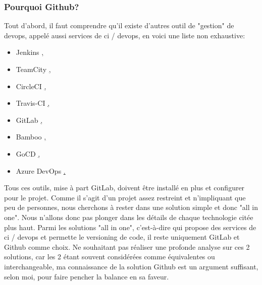 \documentclass[
    iai, %
    il, %
]{heig-tb}
\begin{document}
\subsubsection{Pourquoi Github?}
Tout d'abord, il faut comprendre qu'il existe d'autres outil de "gestion" de \Gls{devops}, appelé aussi services de \Gls{ci} / \Gls{devops}, en voici une liste non exhaustive:
\begin{itemize}
    \item Jenkins \href{https://www.jenkins.io/},
    \item TeamCity \href{https://www.jetbrains.com/teamcity/},
    \item CircleCI \href{https://www.guru99.com/top-20-continuous-integration-tools.html},
    \item Travis-CI \href{https://www.travis-ci.com/},
    \item GitLab \href{https://about.gitlab.com/},
    \item Bamboo \href{https://www.atlassian.com/software/bamboo},
    \item GoCD \href{https://www.gocd.org/},
    \item Azure DevOps \href{https://azure.microsoft.com/fr-fr/services/devops/}.
\end{itemize}

Tous ces outils, mise à part GitLab, doivent être installé en plus et configurer pour le projet.\newline
Comme il s'agit d'un projet assez restreint et n'impliquant que peu de personnes, nous cherchons à rester dans une solution simple et donc "all in one".\newline
Nous n'allons donc pas plonger dans les détails de chaque technologie citée plus haut.\newline
Parmi les solutions "all in one", c'est-à-dire qui propose des services de \Gls{ci} / \Gls{devops} et permette le versioning de code, il reste uniquement GitLab et Github comme choix.\newline
Ne souhaitant pas réaliser une profonde analyse sur ces 2 solutions, car les 2 étant souvent considérées comme équivalentes ou interchangeable, ma connaissance de la solution Github est un argument suffisant, selon moi, pour faire pencher la balance en sa faveur.
\end{document}
